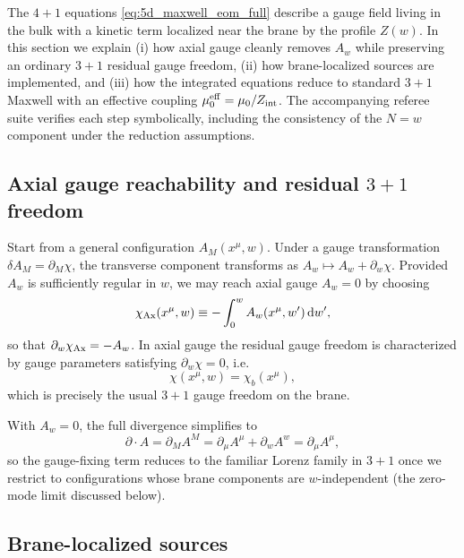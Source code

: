 \documentclass[11pt]{article}
\newcommand{\dd}{\mathrm d}
\newcommand{\A}{A}
\newcommand{\Z}{Z}
\newcommand{\Zint}{Z_{\rm int}} %
\newcommand{\muo}{\mu_0}
\newcommand{\mueff}{\mu_0^{\rm eff}}
\begin{document}
The \(4+1\) equations \cref{eq:5d_maxwell_eom_full} describe a gauge field living
in the bulk with a kinetic term localized near the brane by the profile \(\Z(w)\).
In this section we explain (i) how axial gauge cleanly removes \(\A_w\) while
preserving an ordinary \(3+1\) residual gauge freedom, (ii) how brane-localized
sources are implemented, and (iii) how the integrated equations reduce to
standard \(3+1\) Maxwell with an effective coupling
\(\mueff=\muo/\Zint\). The accompanying referee suite verifies each step
symbolically, including the consistency of the \(N=w\) component under the
reduction assumptions.

\subsection{Axial gauge reachability and residual \(3+1\) freedom}
\label{sec:axial_gauge}

Start from a general configuration \(\A_M(x^\mu,w)\). Under a gauge transformation
\(\delta\A_M=\partial_M\chi\), the transverse component transforms as
\(\A_w\mapsto \A_w+\partial_w\chi\). Provided \(\A_w\) is sufficiently regular in
\(w\), we may reach axial gauge \(\A_w=0\) by choosing
\begin{equation}
  \chi_{\rm Ax}(x^\mu,w)
  \equiv -\int_{0}^{w}\A_w(x^\mu,w')\,\dd w',
  \label{eq:chi_axial}
\end{equation}
so that \(\partial_w\chi_{\rm Ax}=-\A_w\). In axial gauge the residual gauge
freedom is characterized by gauge parameters satisfying \(\partial_w\chi=0\), i.e.
\begin{equation}
  \chi(x^\mu,w)=\chi_b(x^\mu),
\end{equation}
which is precisely the usual \(3+1\) gauge freedom on the brane.

With \(\A_w=0\), the full divergence simplifies to
\begin{equation}
  \partial\!\cdot\!\A
  = \partial_M \A^M
  = \partial_\mu \A^\mu + \partial_w \A^w
  = \partial_\mu \A^\mu,
\end{equation}
so the gauge-fixing term reduces to the familiar Lorenz family in \(3+1\) once we
restrict to configurations whose brane components are \(w\)-independent (the
zero-mode limit discussed below).

\subsection{Brane-localized sources}
\label{sec:brane_sources}
\end{document}
